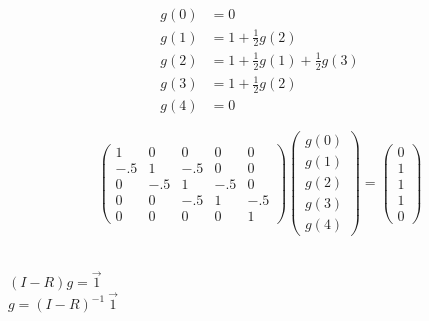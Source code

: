 \documentclass{article}
\begin{document}
\noindent
\begin{minipage}[t]{0.2\textwidth}
\begin{align*}
g(0) &= 0 \\
g(1) &= 1 + \tfrac{1}{2} g(2) \\
g(2) &= 1 + \tfrac{1}{2} g(1) + \tfrac{1}{2} g(3) \\
g(3) &= 1 + \tfrac{1}{2} g(2) \\
g(4) &= 0
\end{align*}
\end{minipage}
\hspace{1.5em}
\begin{minipage}[t]{0.50\textwidth}
$$\left(
\begin{array}{c|ccc|c}
1   & 0   & 0   & 0   & 0 \\
\hline
-.5  & 1  & -.5  & 0   & 0 \\
0   & -.5  & 1  & -.5  & 0 \\
0   & 0   & -.5  & 1  & -.5 \\
\hline
0   & 0   & 0   & 0   & 1
\end{array}
\right)
\begin{pmatrix}
g(0) \\ g(1) \\ g(2) \\ g(3) \\ g(4)
\end{pmatrix}
=
\begin{pmatrix}
0 \\ 1 \\ 1 \\ 1 \\ 0
\end{pmatrix}$$
\end{minipage}
\hspace{2em}
\begin{minipage}[t]{0.24\textwidth}
\vspace*{1\baselineskip}
 \\

$(I-R) g = \vec{1}$ \\

$g = (I-R)^{-1} \ \vec{1}$
\end{minipage} \\ \\
\end{document}
